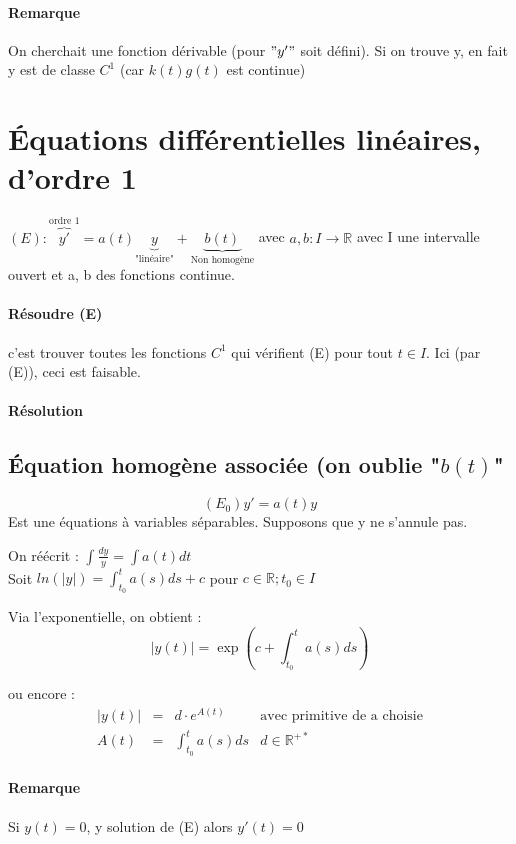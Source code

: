 \paragraph{Remarque} On cherchait une fonction dérivable (pour $"y'"$ soit défini). Si on trouve y, en fait y est de classe $C^1$ (car $k(t)g(t)$ est continue)

\section{Équations différentielles linéaires, d'ordre 1}

$(E) :  \overbrace{y'}^{\text{ordre 1}} = a(t)\underbrace{y}_{\text{"linéaire"}} + \underbrace{b(t)}_{\text{Non homogène}}$ avec $a, b : I \to \mathbb{R}$ avec I une intervalle ouvert  et a, b des fonctions continue.

\paragraph{Résoudre (E)} c'est trouver toutes les fonctions $C^1$ qui vérifient (E) pour tout $t \in I$. Ici (par (E)), ceci est faisable.

\paragraph{Résolution}
\subsection{Équation homogène associée (on oublie "$b(t)$"}

\[(E_0) y' = a(t) y\]
Est une équations à variables séparables. Supposons que y ne s'annule pas.

On réécrit : $\int \frac{dy}{y} = \int a(t) dt$ ~\\
Soit $ln(|y|) = \int_{t_0}^t a(s)ds + c$ pour $c \in \mathbb{R}; t_0 \in I$

Via l'exponentielle, on obtient : \[|y(t)| = \exp(c+\int_{t_0}^t a(s)ds)\]

ou encore : \[\begin{array}{rclr}
|y(t)| &=& d \cdot e^{A(t)} & \text{avec primitive de a choisie}  \\
A(t) &=& \int_{t_0}^t a(s)ds & d \in \mathbb{R}^{+*}
\end{array}\]

\paragraph{Remarque} Si $y(t) = 0$, y solution de (E) alors $y'(t) = 0$

